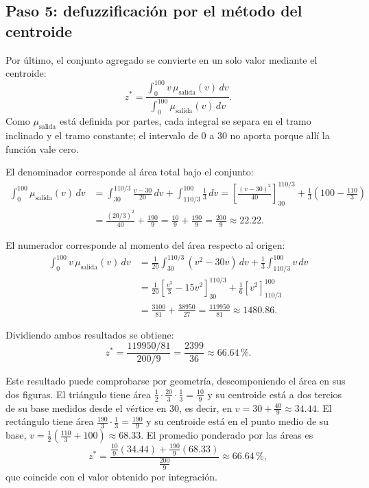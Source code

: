 \documentclass[11pt]{article}
\begin{document}
\subsection{Paso 5: defuzzificación por el método del centroide}

Por último, el conjunto agregado se convierte en un solo valor mediante el centroide:
\[
z^{*} = \frac{\int_{0}^{100} v \, \mu_{\text{salida}}(v) \, dv}{\int_{0}^{100} \mu_{\text{salida}}(v) \, dv}.
\]
Como $\mu_{\text{salida}}$ está definida por partes, cada integral se separa en el tramo inclinado y el tramo constante; el intervalo de $0$ a $30$ no aporta porque allí la función vale cero.

El denominador corresponde al área total bajo el conjunto:
\begin{align*}
\int_{0}^{100} \mu_{\text{salida}}(v)\,dv
&= \int_{30}^{110/3} \frac{v - 30}{20}\,dv + \int_{110/3}^{100} \frac{1}{3}\,dv
= \left[\frac{(v - 30)^2}{40}\right]_{30}^{110/3} + \frac{1}{3}\left(100 - \frac{110}{3}\right) \\
&= \frac{(20/3)^2}{40} + \frac{190}{9}
= \frac{10}{9} + \frac{190}{9}
= \frac{200}{9} \approx 22.22.
\end{align*}

El numerador corresponde al momento del área respecto al origen:
\begin{align*}
\int_{0}^{100} v\,\mu_{\text{salida}}(v)\,dv
&= \frac{1}{20}\int_{30}^{110/3} (v^2 - 30v)\,dv + \frac{1}{3}\int_{110/3}^{100} v\,dv \\
&= \frac{1}{20}\left[\frac{v^3}{3} - 15v^2\right]_{30}^{110/3} + \frac{1}{6}\left[v^2\right]_{110/3}^{100} \\
&= \frac{3100}{81} + \frac{38950}{27}
= \frac{119950}{81} \approx 1480.86.
\end{align*}

Dividiendo ambos resultados se obtiene:
\[
z^{*} = \frac{119950/81}{200/9} = \frac{2399}{36} \approx 66.64\,\%.
\]

Este resultado puede comprobarse por geometría, descomponiendo el área en sus dos figuras. El triángulo tiene área $\frac{1}{2}\cdot\frac{20}{3}\cdot\frac{1}{3} = \frac{10}{9}$ y su centroide está a dos tercios de su base medidos desde el vértice en $30$, es decir, en $v = 30 + \frac{40}{9} \approx 34.44$. El rectángulo tiene área $\frac{190}{3}\cdot\frac{1}{3} = \frac{190}{9}$ y su centroide está en el punto medio de su base, $v = \frac{1}{2}\left(\frac{110}{3} + 100\right) \approx 68.33$. El promedio ponderado por las áreas es
\[
z^{*} = \frac{\frac{10}{9}(34.44) + \frac{190}{9}(68.33)}{\frac{200}{9}} \approx 66.64\,\%,
\]
que coincide con el valor obtenido por integración.
\end{document}
